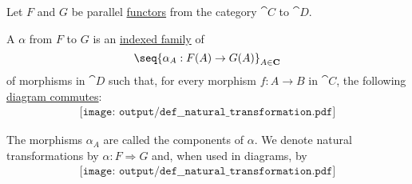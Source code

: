 \begin{definition}\label{def:natural_transformation}
  Let \( F \) and \( G \) be parallel \hyperref[def:functor]{functors} from the category \( \cat{C} \) to \( \cat{D} \).

  A  \( \alpha \) from \( F \) to \( G \) is an \hyperref[def:tuple_and_cartesian_product/indexed_family]{indexed family} of
  \begin{equation}\label{eq:def:natural_transformation/family}
    \seq{ \alpha_A: F(A) \to G(A) }_{A \in \cat{C}}
  \end{equation}
  of morphisms in \( \cat{D} \) such that, for every morphism \( f: A \to B \) in \( \cat{C} \), the following \hyperref[def:categorical_diagram]{diagram commutes}:
  \begin{equation}\label{eq:def:natural_transformation/diagram}
    \begin{aligned}
      \texttt{[image: output/def\_\_natural\_transformation.pdf]}
    \end{aligned}
  \end{equation}

  The morphisms \( \alpha_A \) are called the components of \( \alpha \). We denote natural transformations by \( \alpha: F \Rightarrow G \) and, when used in diagrams, by
  \begin{equation}\label{eq:def:natural_transformation/notation}
    \begin{aligned}
      \texttt{[image: output/def\_\_natural\_transformation.pdf]}
    \end{aligned}
  \end{equation}
\end{definition}

